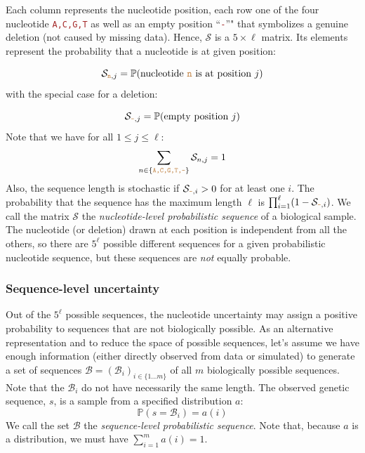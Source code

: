 \documentclass[
]{article}
\newcommand{\sq}[1]{\texttt{\textcolor{brown}{#1}}}
\newcommand{\sps}{\mathcal{B}} %
\newcommand{\nps}{\mathcal{S}} %
\newcommand{\nlps}{nucleotide-level probabilistic sequence\xspace}
\newcommand{\slps}{sequence-level probabilistic sequence\xspace}
\newcommand{\pr}[1]{\mathbb{P}(#1)}
\begin{document}
Each column represents the nucleotide position, each row one of the four
nucleotide \sq{A,C,G,T} as well as an empty position ``\sq{-}''" that
symbolizes a genuine deletion (not caused by missing data). Hence,
\(\nps\) is a \(5\times\ell\) matrix. Its elements represent the
probability that a nucleotide is at given position:

\begin{equation}
\nps_{\sq{n},j} = \pr{\text{nucleotide \sq{n} is at position }j}
\end{equation} with the special case for a deletion:

\begin{equation}
\nps_{\sq{-},j} = \pr{\text{empty position }j}
\end{equation} Note that we have for all \(1\leq j \leq \ell\):
\begin{equation}
\sum_{n\in \{ \sq{A,C,G,T,-} \} } \nps_{n, j} = 1
\end{equation} Also, the sequence length is stochastic if
\(\nps_{\sq{-},i}>0\) for at least one \(i\). The probability that the
sequence has the maximum length \(\ell\) is
\(\prod_{i=1}^\ell (1-\nps_{\sq{-},i})\). We call the matrix \(\nps\)
the \emph{\nlps} of a biological sample. The nucleotide (or deletion)
drawn at each position is independent from all the others, so there are
\(5^\ell\) possible different sequences for a given probabilistic
nucleotide sequence, but these sequences are \emph{not} equally
probable.

\hypertarget{sequence-level-uncertainty}{%
\subsubsection{Sequence-level
uncertainty}\label{sequence-level-uncertainty}}

Out of the \(5^\ell\) possible sequences, the nucleotide uncertainty may
assign a positive probability to sequences that are not biologically
possible. As an alternative representation and to reduce the space of
possible sequences, let's assume we have enough information (either
directly observed from data or simulated) to generate a set of sequences
\(\sps = (\sps_i)_{i\in\{1\ldots m\} }\) of all \(m\) biologically
possible sequences. Note that the \(\sps_i\) do not have necessarily the
same length. The observed genetic sequence, \(s\), is a sample from a
specified distribution \(a\): \begin{equation}
\pr{s = \sps_i} = a(i)
\end{equation} We call the set \(\sps\) the \emph{\slps}. Note that,
because \(a\) is a distribution, we must have \(\sum_{i=1}^m a(i) = 1\).
\end{document}

